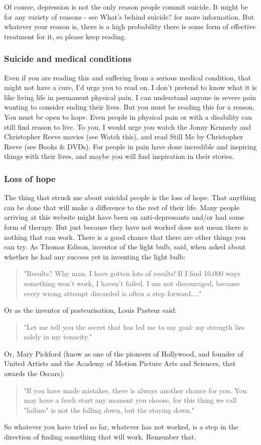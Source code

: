 \documentclass[12pt]{article}
\begin{document}
Of course, depression is not the only reason people commit suicide. It might be for any variety of reasons - see What's behind suicide? for more information. But whatever your reason is, there is a high probability there is some form of effective treatment for it, so please keep reading.

\subsubsection{Suicide and medical conditions}

Even if you are reading this and suffering from a serious medical condition, that might not have a cure, I'd urge you to read on. I don't pretend to know what it is like living life in permanent physical pain. I can understand anyone in severe pain wanting to consider ending their lives. But you must be reading this for a reason. You must be open to hope. Even people in physical pain or with a disability can still find reason to live. To you, I would urge you watch the Jonny Kennedy and Christopher Reeve movies (see Watch this), and read Still Me by Christopher Reeve (see Books \& DVDs). For people in pain have done incredible and inspiring things with their lives, and maybe you will find inspiration in their stories.

\subsubsection{Loss of hope}

The thing that struck me about suicidal people is the loss of hope. That anything can be done that will make a difference to the rest of their life. Many people arriving at this website might have been on anti-depressants and/or had some form of therapy. But just because they have not worked does not mean there is nothing that can work. There is a good chance that there are other things you can try. As Thomas Edison, inventor of the light bulb, said, when asked about whether he had any success yet in inventing the light bulb:
\begin{quote}
"Results? Why man, I have gotten lots of results! If I find 10,000 ways something won't work, I haven't failed. I am not discouraged, because every wrong attempt discarded is often a step forward...."
\end{quote}
Or as the inventor of pasteurisation, Louis Pasteur said:
\begin{quote}
"Let me tell you the secret that has led me to my goal: my strength lies solely in my tenacity."
\end{quote}
Or, Mary Pickford (know as one of the pioneers of Hollywood, and founder of United Artists and the Academy of Motion Picture Arts and Sciences, that awards the Oscars):
\begin{quote}
"If you have made mistakes, there is always another chance for you. You may have a fresh start any moment you choose, for this thing we call "failure" is not the falling down, but the staying down."
\end{quote}
So whatever you have tried so far, whatever has not worked, is a step in the direction of finding something that will work. Remember that.
\end{document}
